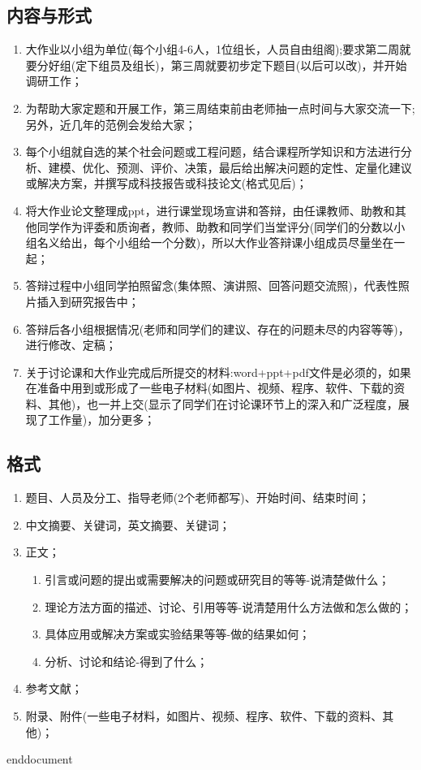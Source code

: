 	\subsection{内容与形式}
	\begin{enumerate}
		\item 大作业以小组为单位(每个小组4-6人，1位组长，人员自由组阁);要求第二周就要分好组(定下组员及组长)，第三周就要初步定下题目(以后可以改)，并开始调研工作；
		\item 为帮助大家定题和开展工作，第三周结束前由老师抽一点时间与大家交流一下;另外，近几年的范例会发给大家；
		\item 每个小组就自选的某个社会问题或工程问题，结合课程所学知识和方法进行分析、建模、优化、预测、评价、决策，最后给出解决问题的定性、定量化建议或解决方案，并撰写成科技报告或科技论文(格式见后)；
		\item 将大作业论文整理成ppt，进行课堂现场宣讲和答辩，由任课教师、助教和其他同学作为评委和质询者，教师、助教和同学们当堂评分(同学们的分数以小组名义给出，每个小组给一个分数)，所以大作业答辩课小组成员尽量坐在一起；
		\item 答辩过程中小组同学拍照留念(集体照、演讲照、回答问题交流照)，代表性照片插入到研究报告中；
		\item 答辩后各小组根据情况(老师和同学们的建议、存在的问题未尽的内容等等)，进行修改、定稿；
		\item 关于讨论课和大作业完成后所提交的材料:word+ppt+pdf文件是必须的，如果在准备中用到或形成了一些电子材料(如图片、视频、程序、软件、下载的资料、其他)，也一并上交(显示了同学们在讨论课环节上的深入和广泛程度，展现了工作量)，加分更多；
	\end{enumerate}
	\subsection{格式}
	\begin{enumerate}
		\item 题目、人员及分工、指导老师(2个老师都写)、开始时间、结束时间；
		\item 中文摘要、关键词，英文摘要、关键词；
		\item 正文；
		\begin{enumerate}
			\item 引言或问题的提出或需要解决的问题或研究目的等等-说清楚做什么；
			\item 理论方法方面的描述、讨论、引用等等-说清楚用什么方法做和怎么做的；
			\item 具体应用或解决方案或实验结果等等-做的结果如何；
			\item 分析、讨论和结论-得到了什么；
		\end{enumerate}
		\item 参考文献；
		\item 附录、附件(一些电子材料，如图片、视频、程序、软件、下载的资料、其他)；
	\end{enumerate}

\ifx\allfiles\undefined
	
	
	
	end{document}
	\else
	\fi